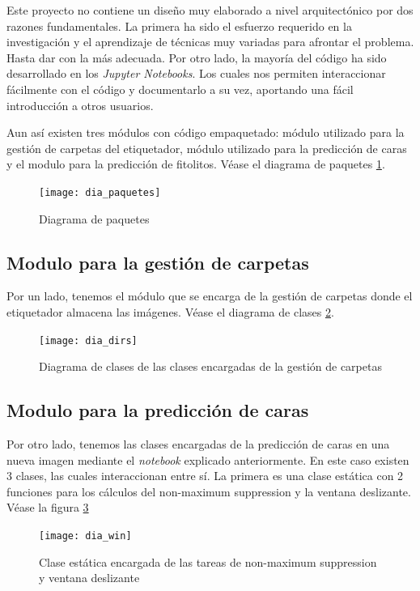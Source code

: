 Este proyecto no contiene un diseño muy elaborado a nivel arquitectónico por dos razones fundamentales. La primera ha sido el esfuerzo requerido en la investigación y el aprendizaje de técnicas muy variadas para afrontar el problema. Hasta dar con la más adecuada. Por otro lado, la mayoría del código ha sido desarrollado en los \textit{Jupyter Notebooks}. Los cuales nos permiten interaccionar fácilmente con el código y documentarlo a su vez, aportando una fácil introducción a otros usuarios.

Aun así existen tres módulos con código empaquetado: módulo utilizado para la gestión de carpetas del etiquetador, módulo utilizado para la predicción de caras y el modulo para la predicción de fitolitos. Véase el diagrama de paquetes \ref{fig:C.4.1}.

\begin{figure}
\centering
\texttt{[image: dia\_paquetes]}
\caption{Diagrama de paquetes}
\label{fig:C.4.1}
\end{figure}

\subsection{Modulo para la gestión de carpetas}

Por un lado, tenemos el módulo que se encarga de la gestión de carpetas donde el etiquetador almacena las imágenes. Véase el diagrama de clases \ref{fig:C.4.2}.

\begin{figure}
\centering
\texttt{[image: dia\_dirs]}
\caption[Diagrama de clases para la gestión de carpetas]{Diagrama de clases de las clases encargadas de la gestión de carpetas}
\label{fig:C.4.2}
\end{figure}

\subsection{Modulo para la predicción de caras}

Por otro lado, tenemos las clases encargadas de la predicción de caras en una nueva imagen mediante el \textit{notebook} explicado anteriormente. En este caso existen 3 clases, las cuales interaccionan entre sí. La primera es una clase estática con 2 funciones para los cálculos del non-maximum suppression y la ventana deslizante. Véase la figura \ref{fig:C.4.3} 


\begin{figure}
\centering
\texttt{[image: dia\_win]}
\caption[Clase estática encargada de varias tareas]{Clase estática encargada de las tareas de non-maximum suppression y ventana deslizante}
\label{fig:C.4.3}
\end{figure}

